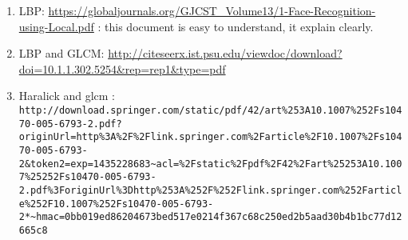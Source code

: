 \begin{enumerate}
\item LBP: \url{https://globaljournals.org/GJCST_Volume13/1-Face-Recognition-using-Local.pdf} : this document is easy to understand, it explain clearly.
\item LBP and GLCM: \url{http://citeseerx.ist.psu.edu/viewdoc/download?doi=10.1.1.302.5254&rep=rep1&type=pdf}
\item Haralick and glcm : \verb|http://download.springer.com/static/pdf/42/art%253A10.1007%252Fs10470-005-6793-2.pdf?originUrl=http%3A%2F%2Flink.springer.com%2Farticle%2F10.1007%2Fs10470-005-6793-2&token2=exp=1435228683~acl=%2Fstatic%2Fpdf%2F42%2Fart%25253A10.1007%25252Fs10470-005-6793-2.pdf%3ForiginUrl%3Dhttp%253A%252F%252Flink.springer.com%252Farticle%252F10.1007%252Fs10470-005-6793-2*~hmac=0bb019ed86204673bed517e0214f367c68c250ed2b5aad30b4b1bc77d12665c8|
\end{enumerate}

    
  